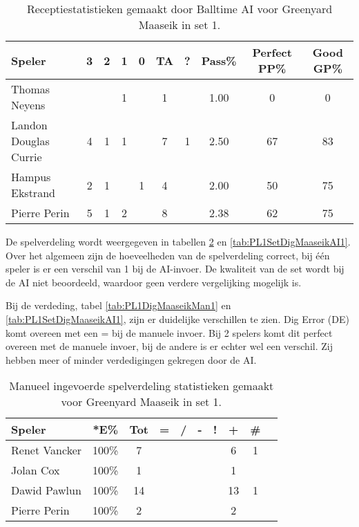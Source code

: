 \begin{table}[ht!]
  \centering
  \scriptsize
  \begin{tabular}{|l|c|c|c|c|c|c|c|c|c|} \hline
    \textbf{Speler} & 3 & 2 & 1 & 0 & TA & ? & Pass\% & Perfect PP\% & Good GP\% \\ \hline
    Thomas Neyens &  &  & 1 &  & 1 &  & 1.00 & 0 & 0  \\
    Landon Douglas Currie & 4 & 1 & 1 &  & 7 & 1 & 2.50 & 67 & 83 \\
    Hampus Ekstrand & 2 & 1 &  & 1 & 4 &  & 2.00 & 50 & 75 \\
    Pierre Perin & 5 & 1 & 2 &  & 8 &  & 2.38 & 62 & 75 \\ \hline
  \end{tabular}
  \caption[Receptiestatistieken gemaakt door Balltime AI voor Greenyard Maaseik in set 1]{\label{tab:PL1ReceiveMaaseikAI1}Receptiestatistieken gemaakt door Balltime AI voor Greenyard Maaseik in set 1.}
\end{table}

De spelverdeling wordt weergegeven in tabellen \ref{tab:PL1SetMaaseikMan1} en \ref{tab:PL1SetDigMaaseikAI1}. Over het algemeen zijn de hoeveelheden van de spelverdeling correct, bij één speler is er een verschil van 1 bij de AI-invoer. De kwaliteit van de set wordt bij de AI niet beoordeeld, waardoor geen verdere vergelijking mogelijk is.

Bij de verdeding, tabel \ref{tab:PL1DigMaaseikMan1} en \ref{tab:PL1SetDigMaaseikAI1}, zijn er duidelijke verschillen te zien. Dig Error (DE) komt overeen met een = bij de manuele invoer. Bij 2 spelers komt dit perfect overeen met de manuele invoer, bij de andere is er echter wel een verschil.  Zij hebben meer of minder verdedigingen gekregen door de AI.

\begin{table}[ht!]
    \centering
    \scriptsize
    \begin{tabular}{|l|c|c|c|c|c|c|c|c|c|} \hline
        \textbf{Speler}& *E\% & Tot & = & / & - & ! & + & \# \\ \hline
        Renet Vancker  & 100\% & 7 &  &  &  &  & 6 & 1  \\
        Jolan Cox  & 100\% & 1 &  &  &  &  & 1 &  \\ 
        Dawid Pawlun  & 100\% & 14 &  &  &  &  & 13 & 1  \\ 
        Pierre Perin & 100\% & 2 &  &  &  &  & 2 & \\ \hline
    \end{tabular}
    \caption[Manueel ingevoerde spelverdelingsstatistieken gemaakt voor Greenyard Maaseik in set 1]{\label{tab:PL1SetMaaseikMan1}Manueel ingevoerde spelverdeling statistieken gemaakt voor Greenyard Maaseik in set 1.}
\end{table}

